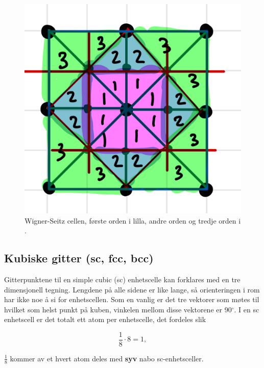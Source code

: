 \begin{figure}[!htb]
    \centering
    \includegraphics[scale=0.2]{Bilder/SamtaleTema4/WS_Celle.jpeg}
    \caption{Wigner-Seitz cellen, første orden i \color{purple}lilla\color{black}, andre orden \color{blue}{blå} \color{black} og tredje orden i \color{green}{grønn}\color{black}.}
    \label{fig:enter-label}
\end{figure}

\subsection{Kubiske gitter (sc, fcc, bcc)}
\label{sec:tema4_5}
Gitterpunktene til en simple cubic (sc) enhetscelle kan forklares med en tre dimensjonell tegning. Lengdene på alle sidene er like lange, så orienteringen i rom har ikke noe å si for enhetscellen. Som en vanlig er det tre vektorer som møtes til hvilket som helst punkt på kuben, vinkelen mellom disse vektorene er 90$^\circ$. I en sc enhetscell er det totalt ett atom per enhetscelle, det fordeles slik

\begin{equation*}
    \frac{1}{8}\cdot 8 = 1,
\end{equation*}

$\frac{1}{8}$ kommer av et hvert atom deles med \textbf{syv} nabo sc-enhetsceller. 

